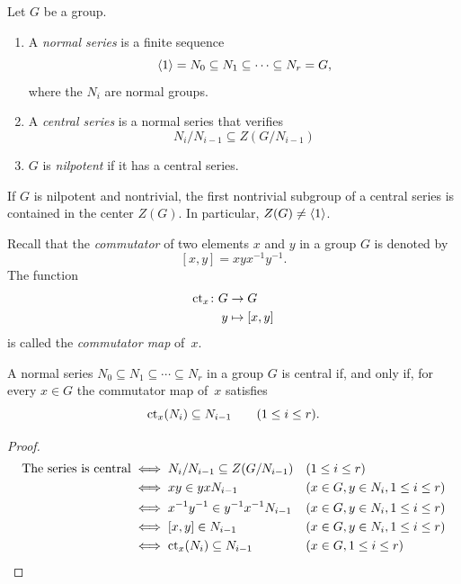 \begin{defns}Let $G$ be a group.
    \begin{enumerate}[\upshape i)]
        \item A \textsl{normal series} is a finite sequence
        $$
            \langle1\rangle=N_0\subseteq N_1\subseteq\cdots\subseteq N_r=G,
        $$
        where the $N_i$ are normal groups.

        \item A \textsl{central series} is a normal series that verifies
        $$
            N_i/N_{i-1}\subseteq Z(G/N_{i-1})
        $$
        \item $G$ is \textsl{nilpotent} if it has a central series.
    \end{enumerate}
\end{defns}

\begin{rem}\label{nontrivial-nilpotent-center}
    If\/ $G$ is nilpotent and nontrivial, the first nontrivial subgroup of a central series is contained in the center\/ $Z(G)$. In particular, $Z(G)\ne\langle1\rangle$.
\end{rem}

\begin{ntns}
    Recall that the \textsl{commutator} of two elements $x$ and $y$ in a group $G$ is denoted by
    $$
        [x,y] = xyx^{-1}y^{-1}.
    $$
    The function
    \begin{align*}
        \operatorname{\operatorname{ct}}_x\colon G&\to G\\
        y&\mapsto[x,y]
    \end{align*}
    is called the \textsl{commutator map} of~$x$.
\end{ntns}

\begin{prop}\label{ad-nilpotent-test}
    A normal series $N_0\subseteq N_1\subseteq\cdots\subseteq N_r$ in a group $G$ is central if, and only if, for every $x\in G$ the commutator map of~$x$ satisfies
    $$
        \operatorname{\operatorname{ct}}_x(N_i)\subseteq N_{i-1}\qquad(1\le i\le r).
    $$
\end{prop}
\begin{proof}
\begin{align*}
    \text{The series is central}
        &\iff N_i/N_{i-1}\subseteq Z(G/N_{i-1})&&(1\le i\le r)\\
        &\iff xy\in yxN_{i-1}&&(x\in G, y\in N_i, 1\le i\le r)\\
        &\iff x^{-1}y^{-1}\in y^{-1}x^{-1}N_{i-1}
            &&(x\in G, y\in N_i, 1\le i\le r)\\
        &\iff [x,y]\in N_{i-1}
            &&(x\in G, y\in N_i, 1\le i\le r)\\
        &\iff \operatorname{\operatorname{ct}}_x(N_i)\subseteq N_{i-1}&&(x\in G,1\le i\le r)
\end{align*}
 \end{proof}

